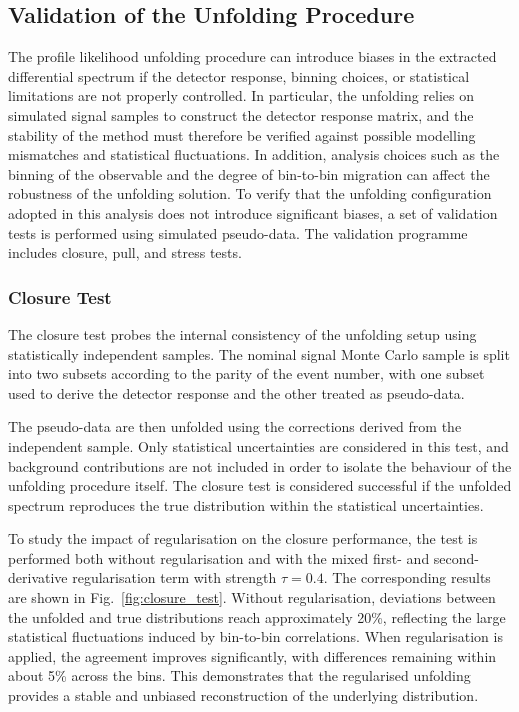 \subsection{Validation of the Unfolding Procedure}
\label{sec:unfolding_validation}

The profile likelihood unfolding procedure can introduce biases in the extracted differential spectrum if the detector response, binning choices, or statistical limitations are not properly controlled. 
In particular, the unfolding relies on simulated signal samples to construct the detector response matrix, and the stability of the method must therefore be verified against possible modelling mismatches and statistical fluctuations. 
In addition, analysis choices such as the binning of the observable and the degree of bin-to-bin migration can affect the robustness of the unfolding solution.
To verify that the unfolding configuration adopted in this analysis does not introduce significant biases, a set of validation tests is performed using simulated pseudo-data. 
The validation programme includes closure, pull, and stress tests.

\subsubsection*{\textbf{Closure Test}}

The closure test probes the internal consistency of the unfolding setup using statistically independent samples. 
The nominal signal Monte Carlo sample is split into two subsets according to the parity of the event number, with one subset used to derive the detector response and the other treated as pseudo-data.

The pseudo-data are then unfolded using the corrections derived from the independent sample. 
Only statistical uncertainties are considered in this test, and background contributions are not included in order to isolate the behaviour of the unfolding procedure itself. 
The closure test is considered successful if the unfolded spectrum reproduces the true distribution within the statistical uncertainties.

To study the impact of regularisation on the closure performance, the test is performed both without regularisation and with the mixed first- and second-derivative regularisation term with strength $\tau = 0.4$. The corresponding results are shown in Fig.~\ref{fig:closure_test}. 
Without regularisation, deviations between the unfolded and true distributions reach approximately 20\%, reflecting the large statistical fluctuations induced by bin-to-bin correlations. 
When regularisation is applied, the agreement improves significantly, with differences remaining within about 5\% across the bins. 
This demonstrates that the regularised unfolding provides a stable and unbiased reconstruction of the underlying distribution.


